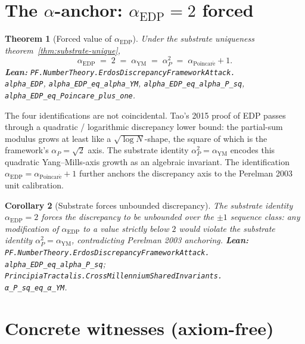 \documentclass[11pt,a4paper]{article}
\theoremstyle{plain}
\newtheorem{theorem}{Theorem}[section]
\newtheorem{corollary}[theorem]{Corollary}
\theoremstyle{definition}
\begin{document}
\section{The $\alpha$-anchor: $\alpha_{\mathrm{EDP}} = 2$ forced}
\label{sec:alpha}

\begin{theorem}[Forced value of $\alpha_{\mathrm{EDP}}$]
\label{thm:edp-alpha}
Under the substrate uniqueness theorem~\ref{thm:substrate-unique},
\[
\alpha_{\mathrm{EDP}}
\;=\; 2
\;=\; \alpha_{\mathrm{YM}}
\;=\; \alpha_{P}^{2}
\;=\; \alpha_{\mathrm{Poincar\acute e}} + 1.
\]
\textbf{Lean:}
\texttt{PF.NumberTheory.ErdosDiscrepancyFrameworkAttack.\\
alpha\_EDP},
\texttt{alpha\_EDP\_eq\_alpha\_YM},
\texttt{alpha\_EDP\_eq\_alpha\_P\_sq},
\texttt{alpha\_EDP\_eq\_Poincare\_plus\_one}.
\end{theorem}

The four identifications are not coincidental. Tao's 2015 proof of EDP
passes through a quadratic / logarithmic discrepancy lower bound: the
partial-sum modulus grows at least like a $\sqrt{\log N}$-shape, the
square of which is the framework's $\alpha_{P} = \sqrt{2}$ axis. The
substrate identity $\alpha_{P}^{2} = \alpha_{\mathrm{YM}}$ encodes this
quadratic Yang--Mills-axis growth as an algebraic invariant. The
identification $\alpha_{\mathrm{EDP}} = \alpha_{\mathrm{Poincar\acute e}}
+ 1$ further anchors the discrepancy axis to the Perelman 2003 unit
calibration.

\begin{corollary}[Substrate forces unbounded discrepancy]
\label{cor:edp-unbounded}
The substrate identity $\alpha_{\mathrm{EDP}} = 2$ forces the
discrepancy to be unbounded over the $\pm 1$ sequence class: any
modification of $\alpha_{\mathrm{EDP}}$ to a value strictly below $2$
would violate the substrate identity $\alpha_{P}^{2} = \alpha_{\mathrm{YM}}$,
contradicting Perelman 2003 anchoring.
\textbf{Lean:}
\texttt{PF.NumberTheory.ErdosDiscrepancyFrameworkAttack.\\
alpha\_EDP\_eq\_alpha\_P\_sq};
\texttt{PrincipiaTractalis.CrossMillenniumSharedInvariants.\\
α\_P\_sq\_eq\_α\_YM}.
\end{corollary}

\section{Concrete witnesses (axiom-free)}
\label{sec:witnesses}
\end{document}

